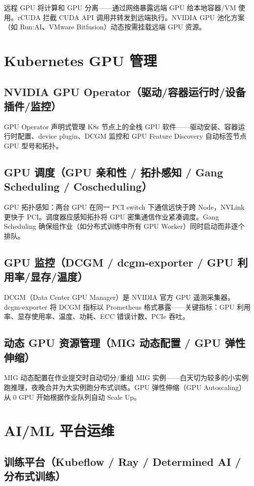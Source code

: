 \documentclass[12pt,UTF8]{ctexbook}
\begin{document}
远程 GPU 将计算和 GPU 分离——通过网络暴露远端 GPU 给本地容器/VM 使用。rCUDA 拦截 CUDA API 调用并转发到远端执行。NVIDIA GPU 池化方案（如 Run:AI、VMware Bitfusion）动态按需挂载远端 GPU 资源。

  \section{Kubernetes GPU 管理}
    \subsection{NVIDIA GPU Operator（驱动/容器运行时/设备插件/监控）}

GPU Operator 声明式管理 K8s 节点上的全栈 GPU 软件——驱动安装、容器运行时配置、device plugin、DCGM 监控和 GPU Feature Discovery 自动标签节点 GPU 型号和拓扑。

    \subsection{GPU 调度（GPU 亲和性 / 拓扑感知 / Gang Scheduling / Coscheduling）}

GPU 拓扑感知：两台 GPU 在同一 PCI switch 下通信远快于跨 Node，NVLink 更快于 PCI。调度器应感知拓扑将 GPU 密集通信作业紧凑调度。Gang Scheduling 确保组作业（如分布式训练中所有 GPU Worker）同时启动而非逐个排队。

    \subsection{GPU 监控（DCGM / dcgm-exporter / GPU 利用率/显存/温度）}

DCGM（Data Center GPU Manager）是 NVIDIA 官方 GPU 遥测采集器。dcgm-exporter 将 DCGM 指标以 Prometheus 格式暴露——关键指标：GPU 利用率、显存使用率、温度、功耗、ECC 错误计数、PCIe 吞吐。

    \subsection{动态 GPU 资源管理（MIG 动态配置 / GPU 弹性伸缩）}

MIG 动态配置在作业提交时自动切分/重组 MIG 实例——白天切为较多的小实例跑推理，夜晚合并为大实例跑分布式训练。GPU 弹性伸缩（GPU Autoscaling）从 0 GPU 开始根据作业队列自动 Scale Up。

  \section{AI/ML 平台运维}
    \subsection{训练平台（Kubeflow / Ray / Determined AI / 分布式训练）}
\end{document}
